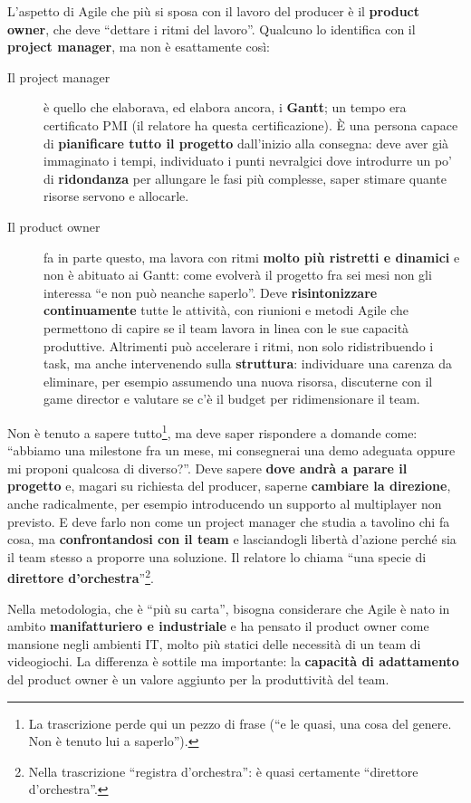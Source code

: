 L'aspetto di Agile che più si sposa con il lavoro del producer è il
\textbf{product owner}, che deve ``dettare i ritmi del lavoro''. Qualcuno lo
identifica con il \textbf{project manager}, ma non è esattamente così:
\begin{description}
  \item[Il project manager] è quello che elaborava, ed elabora ancora, i
        \textbf{Gantt}; un tempo era certificato PMI (il relatore ha questa
        certificazione). È una persona capace di \textbf{pianificare tutto il
        progetto} dall'inizio alla consegna: deve aver già immaginato i tempi,
        individuato i punti nevralgici dove introdurre un po' di
        \textbf{ridondanza} per allungare le fasi più complesse, saper stimare
        quante risorse servono e allocarle.
  \item[Il product owner] fa in parte questo, ma lavora con ritmi \textbf{molto
        più ristretti e dinamici} e non è abituato ai Gantt: come evolverà il
        progetto fra sei mesi non gli interessa ``e non può neanche saperlo''.
        Deve \textbf{risintonizzare continuamente} tutte le attività, con
        riunioni e metodi Agile che permettono di capire se il team lavora in
        linea con le sue capacità produttive. Altrimenti può accelerare i
        ritmi, non solo ridistribuendo i task, ma anche intervenendo sulla
        \textbf{struttura}: individuare una carenza da eliminare, per esempio
        assumendo una nuova risorsa, discuterne con il game director e valutare
        se c'è il budget per ridimensionare il team.
\end{description}
Non è tenuto a sapere tutto\footnote{La trascrizione perde qui un pezzo di
frase (``e le quasi, una cosa del genere. Non è tenuto lui a saperlo'').}, ma
deve saper rispondere a domande come: ``abbiamo una milestone fra un mese, mi
consegnerai una demo adeguata oppure mi proponi qualcosa di diverso?''. Deve
sapere \textbf{dove andrà a parare il progetto} e, magari su richiesta del
producer, saperne \textbf{cambiare la direzione}, anche radicalmente, per
esempio introducendo un supporto al multiplayer non previsto. E deve farlo non
come un project manager che studia a tavolino chi fa cosa, ma
\textbf{confrontandosi con il team} e lasciandogli libertà d'azione perché sia il
team stesso a proporre una soluzione. Il relatore lo chiama ``una specie di
\textbf{direttore d'orchestra}''\footnote{Nella trascrizione ``registra
d'orchestra'': è quasi certamente ``direttore d'orchestra''.}.

Nella metodologia, che è ``più su carta'', bisogna considerare che Agile è nato
in ambito \textbf{manifatturiero e industriale} e ha pensato il product owner
come mansione negli ambienti IT, molto più statici delle necessità di un team di
videogiochi. La differenza è sottile ma importante: la \textbf{capacità di
adattamento} del product owner è un valore aggiunto per la produttività del
team.

